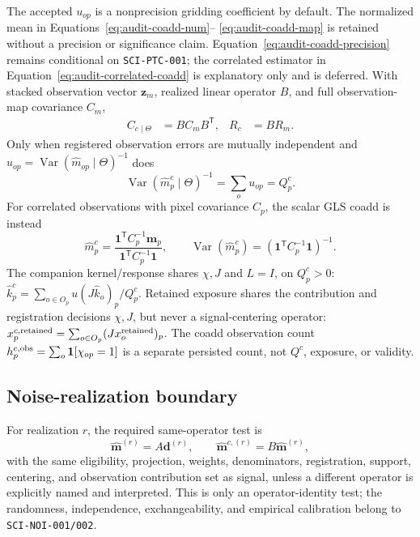 \documentclass[11pt]{article}
\newcommand{\Var}{\operatorname{Var}}
\newcommand{\code}[1]{\nolinkurl{#1}}
\begin{document}
The accepted \(u_{op}\) is a nonprecision gridding coefficient by default.
The normalized mean in Equations~\eqref{eq:audit-coadd-num}--
\eqref{eq:audit-coadd-map} is retained without a precision or significance
claim.  Equation~\eqref{eq:audit-coadd-precision} remains conditional on
\code{SCI-PTC-001}; the correlated estimator in
Equation~\eqref{eq:audit-correlated-coadd} is explanatory only and is deferred.
With stacked observation vector \(\boldsymbol z_m\), realized linear operator
\(B\), and full observation-map covariance \(C_m\),
\begin{align}
 C_{c\mid\Theta}&=B C_m B^{\mathsf T},
 &R_c&=B R_m.
 \label{eq:audit-coadd-cov}
\end{align}
Only when registered observation errors are mutually independent and
\(u_{op}=\Var(\widehat m_{op}\mid\Theta)^{-1}\) does
\begin{equation}
 \Var(\widehat m^c_p\mid\Theta)^{-1}=\sum_o u_{op}=Q^c_p.
 \label{eq:audit-coadd-precision}
\end{equation}
For correlated observations with pixel covariance \(C_p\), the scalar GLS
coadd is instead
\begin{equation}
 \widehat m^c_p=\frac{{\boldsymbol1}^{\mathsf T}C_p^{-1}\boldsymbol m_p}
                       {{\boldsymbol1}^{\mathsf T}C_p^{-1}\boldsymbol1},
 \qquad
 \Var(\widehat m^c_p)=
   ({\boldsymbol1}^{\mathsf T}C_p^{-1}\boldsymbol1)^{-1}.
 \label{eq:audit-correlated-coadd}
\end{equation}
The companion kernel/response shares \(\chi,J\) and \(L=I\), on \(Q^c_p>0\):
\(\widehat k^c_p=\sum_{o\in O_p}u(J\widehat k_o)_p/Q^c_p\).  Retained exposure
shares the contribution and registration decisions \(\chi,J\), but never a
signal-centering operator:
\(x^{c,\rm retained}_p=\sum_{o\in O_p}(Jx^{\rm retained}_o)_p\).  The coadd
observation count
\(h^{c,\rm obs}_p=\sum_o{\bf1}[\chi_{op}=1]\) is a separate persisted count,
not \(Q^c\), exposure, or validity.

\subsection{Noise-realization boundary}

For realization \(r\), the required same-operator test is
\begin{equation}
 \widehat{\boldsymbol m}^{(r)}=A\boldsymbol d^{(r)},\qquad
 \widehat{\boldsymbol m}^{c,(r)}=B\widehat{\boldsymbol m}^{(r)},
 \label{eq:audit-noise-operator}
\end{equation}
with the same eligibility, projection, weights, denominators, registration,
support, centering, and observation contribution set as signal, unless a
different operator is explicitly named and interpreted.  This is only an
operator-identity test; the randomness, independence, exchangeability, and
empirical calibration belong to \code{SCI-NOI-001/002}.
\end{document}

